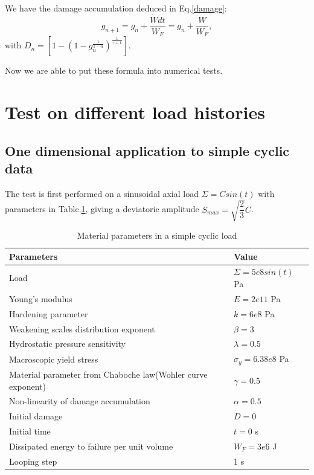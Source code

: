 \documentclass[3p,times,number,review]{elsarticle}
\begin{document}
We have the damage accumulation deduced in Eq.\eqref{damage}:
$$g_{n+1}=g_n+\dfrac{\dot{W}dt}{W_F}=g_n+\dfrac{W}{W_F},$$
with $D_n=\left[1-\left(1-g_n^{\frac{1}{1-\alpha}} \right)^{\frac{1}{\gamma+1}}  \right]. $
 
 Now we are able to put these formula into numerical tests.
 
\section{Test on different load histories}
\subsection{One dimensional application to simple cyclic data}
The test is first performed on a sinusoidal axial load $\Sigma=Csin(t)$ with parameters in Table.\ref{Sin}, giving a deviatoric amplitude $S_{max}=\sqrt{\dfrac{2}{3}}C$.
\begin{table}[!h]
	\centering
	\begin{tabular}{ll}
		\hline
		\textbf{Parameters}                                         & \textbf{Value}                    \\ \hline
		Load                                                              & $\Sigma=5e8sin(t)$ Pa                  \\
		Young's modulus                                             & $E=2e11$ Pa                       \\
		Hardening parameter                                         &  $k=6e8$ Pa \\
		Weakening scales distribution exponent                      & $\beta=3$                             \\
		Hydrostatic pressure sensitivity                            & $\lambda=0.5$                     \\
		Macroscopic yield stress                                    & $\sigma_y=6.38e8$ Pa              \\
		Material parameter from Chaboche law(Wohler curve exponent) & $\gamma=0.5$                        \\
		Non-linearity of damage accumulation & $\alpha=0.5$                        \\
		Initial damage                                              & $D=0$                          \\
		Initial time                                                & $t=0$ s                            \\
		Dissipated energy to failure per unit volume                & $W_F=3e6$ J                       \\
		Looping step                                           & 1 s              \\ \hline
	\end{tabular}
		\caption{Material parameters in a simple cyclic load }
		\label{Sin}
\end{table}
\end{document}
